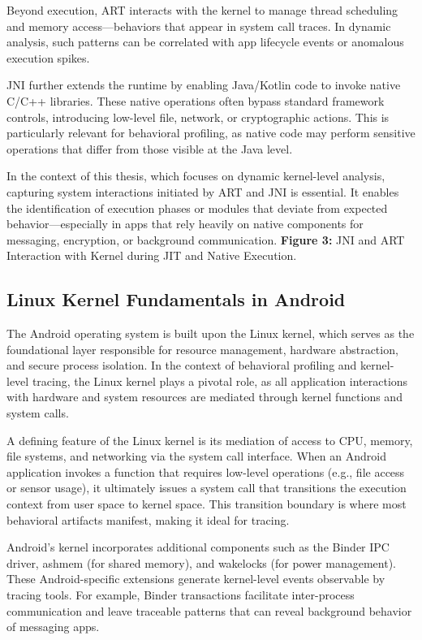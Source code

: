 \documentclass[a4paper,12pt]{report}
\begin{document}
Beyond execution, ART interacts with the kernel to manage thread scheduling and memory access—behaviors that appear in system call traces. In dynamic analysis, such patterns can be correlated with app lifecycle events or anomalous execution spikes.

JNI further extends the runtime by enabling Java/Kotlin code to invoke native C/C++ libraries. These native operations often bypass standard framework controls, introducing low-level file, network, or cryptographic actions. This is particularly relevant for behavioral profiling, as native code may perform sensitive operations that differ from those visible at the Java level.

In the context of this thesis, which focuses on dynamic kernel-level analysis, capturing system interactions initiated by ART and JNI is essential. It enables the identification of execution phases or modules that deviate from expected behavior—especially in apps that rely heavily on native components for messaging, encryption, or background communication.
\textbf{Figure 3:} JNI and ART Interaction with Kernel during JIT and Native Execution.

\subsection{Linux Kernel Fundamentals in Android}
The Android operating system is built upon the Linux kernel, which serves as the foundational layer responsible for resource management, hardware abstraction, and secure process isolation. In the context of behavioral profiling and kernel-level tracing, the Linux kernel plays a pivotal role, as all application interactions with hardware and system resources are mediated through kernel functions and system calls.

A defining feature of the Linux kernel is its mediation of access to CPU, memory, file systems, and networking via the system call interface. When an Android application invokes a function that requires low-level operations (e.g., file access or sensor usage), it ultimately issues a system call that transitions the execution context from user space to kernel space. This transition boundary is where most behavioral artifacts manifest, making it ideal for tracing.

Android’s kernel incorporates additional components such as the Binder IPC driver, ashmem (for shared memory), and wakelocks (for power management). These Android-specific extensions generate kernel-level events observable by tracing tools. For example, Binder transactions facilitate inter-process communication and leave traceable patterns that can reveal background behavior of messaging apps.
\end{document}
